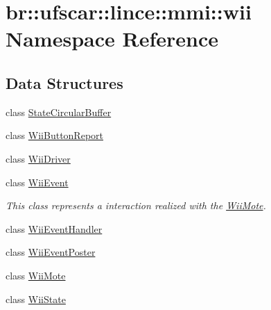 \hypertarget{namespacebr_1_1ufscar_1_1lince_1_1mmi_1_1wii}{
\section{br::ufscar::lince::mmi::wii Namespace Reference}
\label{namespacebr_1_1ufscar_1_1lince_1_1mmi_1_1wii}
}
\subsection*{Data Structures}
\begin{DoxyCompactItemize}
\item 
class \hyperlink{classbr_1_1ufscar_1_1lince_1_1mmi_1_1wii_1_1StateCircularBuffer}{StateCircularBuffer}
\item 
class \hyperlink{classbr_1_1ufscar_1_1lince_1_1mmi_1_1wii_1_1WiiButtonReport}{WiiButtonReport}
\item 
class \hyperlink{classbr_1_1ufscar_1_1lince_1_1mmi_1_1wii_1_1WiiDriver}{WiiDriver}
\item 
class \hyperlink{classbr_1_1ufscar_1_1lince_1_1mmi_1_1wii_1_1WiiEvent}{WiiEvent}
\begin{DoxyCompactList}\small\item\em This class represents a interaction realized with the \hyperlink{classbr_1_1ufscar_1_1lince_1_1mmi_1_1wii_1_1WiiMote}{WiiMote}. \item\end{DoxyCompactList}\item 
class \hyperlink{classbr_1_1ufscar_1_1lince_1_1mmi_1_1wii_1_1WiiEventHandler}{WiiEventHandler}
\item 
class \hyperlink{classbr_1_1ufscar_1_1lince_1_1mmi_1_1wii_1_1WiiEventPoster}{WiiEventPoster}
\item 
class \hyperlink{classbr_1_1ufscar_1_1lince_1_1mmi_1_1wii_1_1WiiMote}{WiiMote}
\item 
class \hyperlink{classbr_1_1ufscar_1_1lince_1_1mmi_1_1wii_1_1WiiState}{WiiState}
\end{DoxyCompactItemize}
